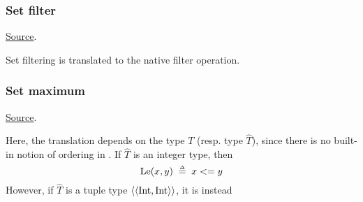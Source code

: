 \subsubsection{Set filter}
\href{https://github.com/saltiniroberto/ssf/blob/7ea6e18093d9da3154b4e396dd435549f687e6b9/high_level/common/pythonic_code_generic.py#L63-L70}{Source}.



\begin{mathpar}
\end{mathpar}
Set filtering is translated to the \tlap native filter operation.

\subsubsection{ Set maximum}
\href{https://github.com/saltiniroberto/ssf/blob/7ea6e18093d9da3154b4e396dd435549f687e6b9/high_level/common/pythonic_code_generic.py#L74-L76}{Source}.



\begin{mathpar}
\end{mathpar}
Here, the translation depends on the type $T$ (resp. type $\hat{T}$), since there is no built-in notion of ordering in \tlap{}. If $\hat{T}$ is an integer type, then 
\[
\Le(x,y) \defeq x <= y
\]
However, if $\hat{T}$ is a tuple type $\tup{\Int,\Int}$, it is instead 

